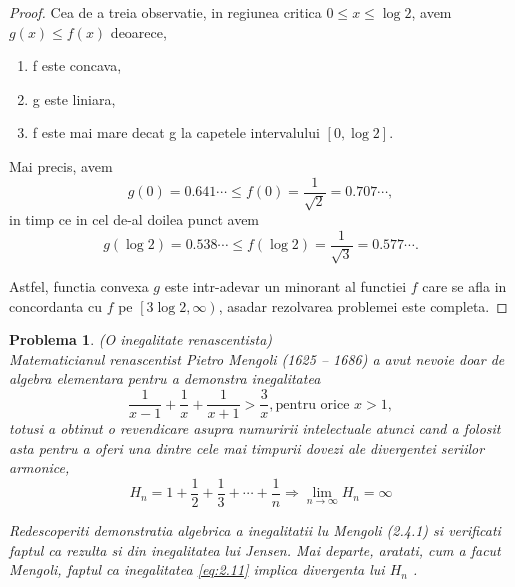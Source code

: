 \documentclass[a4paper,12pt,oneside]{report}
\newtheorem{problem}{Problema}
\begin{document}
\begin{proof}
Cea de a treia observatie, in regiunea critica \(0\leq  x \leq \log2\), avem \(g\left ( x \right ) \leq  f\left ( x \right )\) deoarece,
\begin{enumerate}
  \item f este concava,
  \item g este liniara,
  \item f este mai mare decat g la capetele intervalului \(\left [ 0 , \log 2 \right ]\).
\end{enumerate}
Mai precis, avem
\begin{displaymath}
  g\left ( 0 \right ) = 0.641\cdots \leq f\left ( 0 \right ) = \frac{1}{\sqrt{2}} = 0.707\cdots,
\end{displaymath}
in timp ce in cel de-al doilea punct avem
\begin{displaymath}
  g\left ( \log 2 \right ) = 0.538\cdots  \leq f\left ( \log2 \right ) = \frac{1}{\sqrt{3}} = 0.577\cdots.
\end{displaymath}

Astfel, functia convexa \(g\) este intr-adevar un minorant al functiei \(f\) care se afla in concordanta cu \(f\) pe \(\left [ 3\log 2 , \infty  \right )\), asadar rezolvarea problemei este completa.
\end{proof}
\begin{problem} (O inegalitate renascentista)\\
   Matematicianul renascentist Pietro Mengoli (1625 – 1686) a avut nevoie doar de algebra elementara pentru a demonstra inegalitatea
 \begin{displaymath}
   \frac{1}{x - 1} + \frac{1}{x} + \frac{1}{x + 1} > \frac{3}{x} , \text{pentru orice } x > 1, \label{eq:2.11} \tag{2.11}
 \end{displaymath}
totusi a obtinut o revendicare asupra numuririi intelectuale atunci cand a folosit asta pentru a oferi una dintre cele mai timpurii dovezi ale divergentei seriilor armonice,
\begin{displaymath}
  H_{n} = 1 + \frac{1}{2} + \frac{1}{3} + \cdots + \frac{1}{n} \Rightarrow \lim_{n \to \infty } H_{n} = \infty \label{eq:2.12} \tag{2.12}
\end{displaymath}

Redescoperiti demonstratia algebrica a inegalitatii lu Mengoli (2.4.1) si verificati faptul ca rezulta si din inegalitatea lui Jensen. Mai departe, aratati, cum a facut Mengoli, faptul ca inegalitatea \ref{eq:2.11} implica divergenta lui \(H_{n}\) .
\end{problem}
\end{document}
